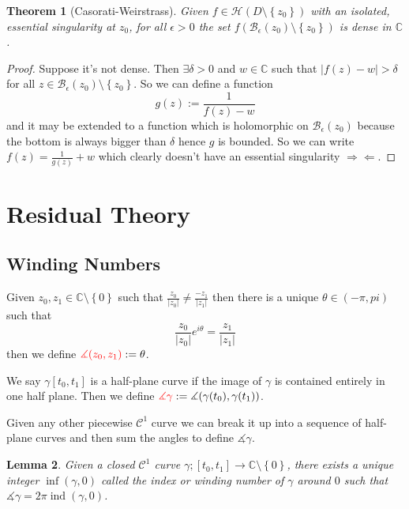 \documentclass[11pt]{article}
\newcommand{\defeq}{:=}
\newcommand{\abs}[1]{\left|#1\right|}
\DeclareMathOperator{\ind}{\text{ind}}
\newcommand{\contr}{\Rightarrow\Leftarrow}
\newcommand{\C}{\mathbb{C}}
\newenvironment{defin}
	{\begin{mdframed}[backgroundcolor=white, roundcorner=5pt, linewidth=1pt]}
	{\end{mdframed}}
\newcommand{\mdf}[1]{{\color{red} #1}}
\newtheorem{theorem}{Theorem}[section]
\newtheorem{lemma}[theorem]{Lemma}
\begin{document}
\begin{theorem}[Casorati-Weirstrass]
Given $f\in\mathcal{H}(D\setminus\left\{z_0\right\})$ with an isolated, essential singularity at $z_0$, for all $\epsilon>0$ the set $f(\mathcal{B}_\epsilon(z_0)\setminus\left\{z_0\right\})$ is dense in $\C$.
\end{theorem}

\begin{proof}
Suppose it's not dense.
Then $\exists\delta >0$ and $w\in\C$ such that $\abs{f(z)-w}>\delta$ for all $z\in\mathcal{B}_\epsilon(z_0)\setminus\left\{z_0\right\}$.
So we can define a function
\[
	g(z)\defeq\frac{1}{f(z)-w}
\]
and it may be extended to a function which is holomorphic on $\mathcal{B}_\epsilon(z_0)$ because the bottom is always bigger than $\delta$ hence $g$ is bounded.
So we can write $f(z)=\frac{1}{g(z)}+w$ which clearly doesn't have an essential singularity $\contr$.
\end{proof}

\section{Residual Theory}

\subsection{Winding Numbers}
\begin{defin}
	Given $z_0, z_1\in\C\setminus\left\{0\right\}$ such that $\frac{z_0}{\abs{z_0}}\neq\frac{-z_1}{\abs{z_1}}$ then there is a unique $\theta\in (-\pi, pi)$ such that
	\[
		\frac{z_0}{\abs{z_0}}e^{i\theta}=\frac{z_1}{\abs{z_1}}
	\]
	then we define $\mdf{\measuredangle(z_0,z_1)}\defeq\theta$.
	
	We say $\gamma[t_0, t_1]$ is a \mdf{half-plane curve} if the image of $\gamma$ is contained entirely in one half plane.
	Then we define $\mdf{\measuredangle\gamma}\defeq\measuredangle(\gamma(t_0),\gamma(t_1))$.

	Given any other piecewise $\mathcal{C}^1$ curve we can break it up into a sequence of half-plane curves and then sum the angles to define $\measuredangle\gamma$.
\end{defin}

\begin{lemma}
Given a closed $\mathcal{C}^1$ curve $\gamma;[t_0, t_1]\to\C\setminus\left\{0\right\}$, there exists a unique integer \mdf{$\inf(\gamma,0)$} called the \mdf{index} or \mdf{winding number} of $\gamma$ around $0$ such that $\measuredangle\gamma=2\pi \ind(\gamma, 0)$.
\end{lemma}
\end{document}
